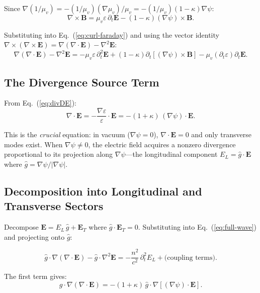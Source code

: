 \documentclass[aps,prd,twocolumn,superscriptaddress,nofootinbib,floatfix]{revtex4-2}
\newcommand{\cvac}{c}
\newcommand{\Evec}{\mathbf{E}}
\newcommand{\Bvec}{\mathbf{B}}
\begin{document}
Since $\nabla(1/\mu_v) = -(1/\mu_v)(\nabla\mu_v)/\mu_v = -(1/\mu_v)(1-\kappa)\nabla\psi$:
\begin{equation}
\nabla\times\Bvec = \mu_v\varepsilon\,\partial_t\Evec - (1-\kappa)(\nabla\psi)\times\Bvec.
\label{eq:curl-B}
\end{equation}

Substituting into Eq.~(\ref{eq:curl-faraday}) and using the
vector identity
$\nabla\times(\nabla\times\Evec) = \nabla(\nabla\cdot\Evec) - \nabla^2\Evec$:
\begin{equation}
\nabla(\nabla\cdot\Evec) - \nabla^2\Evec = -\mu_v\varepsilon\,\partial_t^2\Evec
+ (1-\kappa)\partial_t[(\nabla\psi)\times\Bvec]
- \mu_v(\partial_t\varepsilon)\partial_t\Evec.
\label{eq:full-wave}
\end{equation}

\subsection{The Divergence Source Term}

From Eq.~(\ref{eq:divDE}):
\begin{equation}
\nabla\cdot\Evec = -\frac{\nabla\varepsilon}{\varepsilon}\cdot\Evec
= -(1+\kappa)\,(\nabla\psi)\cdot\Evec.
\label{eq:divE}
\end{equation}

This is the \emph{crucial} equation: in vacuum ($\nabla\psi = 0$),
$\nabla\cdot\Evec = 0$ and only transverse modes exist.  When
$\nabla\psi \neq 0$, the electric field acquires a nonzero divergence
proportional to its projection along $\nabla\psi$---the longitudinal
component $E_L = \hat{g}\cdot\Evec$ where $\hat{g} = \nabla\psi/|\nabla\psi|$.

\subsection{Decomposition into Longitudinal and Transverse Sectors}

Decompose $\Evec = E_L\,\hat{g} + \Evec_T$ where
$\hat{g}\cdot\Evec_T = 0$.  Substituting into Eq.~(\ref{eq:full-wave})
and projecting onto $\hat{g}$:

\begin{equation}
\hat{g}\cdot\nabla(\nabla\cdot\Evec) - \hat{g}\cdot\nabla^2\Evec
= -\frac{n^2}{\cvac^2}\,\partial_t^2 E_L + \text{(coupling terms)}.
\end{equation}

The first term gives:
\begin{equation}
\hat{g}\cdot\nabla(\nabla\cdot\Evec) = -(1+\kappa)\,\hat{g}\cdot\nabla[(\nabla\psi)\cdot\Evec].
\end{equation}
\end{document}
